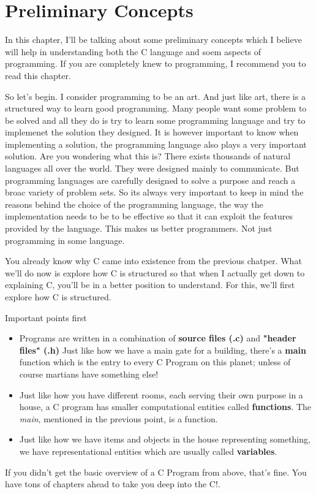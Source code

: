 \chapter{Preliminary Concepts}


In this chapter, I'll be talking about some preliminary concepts which I believe will help in understanding both the C language and soem aspects of programming. If you are completely knew to programming, I recommend you to read this chapter.

So let's begin. I consider programming to be an art. And just like art, there is a structured way to learn good programming. Many people want some problem to be solved and all they do is try to learn some programming language and try to implemenet the solution they designed. It is however important to know when implementing a solution, the programming language also plays a very important solution. Are you wondering what this is? There exists thousands of natural languages all over the world. They were designed mainly to communicate. But programming languages are carefully designed to solve a purpose and reach a broac variety of problem sets. So its always very important to keep in mind the reasons behind the choice of the programming language, the way the implementation needs to be to be effective so that it can exploit the features provided by the language. This makes us better programmers. Not just programming in some language. 

You already know why C came into existence from the previous chatper. What we'll do now is explore how C is structured so that when I actually get down to explaining C, you'll be in a better position to understand. For this, we'll first explore how C is structured. 

Important points first
\begin{itemize}
\item Programs are written in a combination of \textbf{source files (.c)} and \textbf{"header files" (.h)}
\itme Just like how we have a main gate for a building, there's a \textbf{main} function which is the entry to every C Program on this planet; unless of course martians have something else!
\item Just like how you have different rooms, each serving their own purpose in a house, a C program has smaller computational entities called \textbf{functions}. The \textit{main}, mentioned in the previous point, is a function.
\item Just like how we have items and objects in the house representing something, we have representational entities which are usually called \textbf{variables}. 
\end{itemize}

If you didn't get the basic overview of a C Program from above, that's fine. You have tons of chapters ahead to take you deep into the C!. 